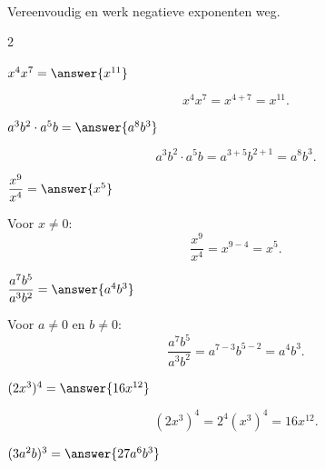 \documentclass{ximera}
\begin{document}
\begin{oefening}[Machten]{\oefB\ESS}
    \\
    
    Vereenvoudig en werk negatieve exponenten weg.
    
    \begin{multicols}{2}
    
    \begin{question}
    $x^4x^7=\answer{x^{11}}$
    
    \begin{oplossing}
    \[
    x^4x^7=x^{4+7}=x^{11}.
    \]
    \end{oplossing}
    \end{question}
    
    
    \begin{question}
    $a^3b^2\cdot a^5b=\answer{a^8b^3}$
    
    \begin{oplossing}
    \[
    a^3b^2\cdot a^5b
    =a^{3+5}b^{2+1}
    =a^8b^3.
    \]
    \end{oplossing}
    \end{question}
    
    
    \begin{question}
    $\dfrac{x^9}{x^4}=\answer{x^5}$
    
    \begin{oplossing}
    Voor $x\neq0$:
    \[
    \dfrac{x^9}{x^4}
    =x^{9-4}
    =x^5.
    \]
    \end{oplossing}
    \end{question}
    
    
    \begin{question}
    $\dfrac{a^7b^5}{a^3b^2}
    =\answer{a^4b^3}$
    
    \begin{oplossing}
    Voor $a\neq0$ en $b\neq0$:
    \[
    \dfrac{a^7b^5}{a^3b^2}
    =a^{7-3}b^{5-2}
    =a^4b^3.
    \]
    \end{oplossing}
    \end{question}
    
    
    \begin{question}
    $(2x^3)^4=\answer{16x^{12}}$
    
    \begin{oplossing}
    \[
    (2x^3)^4
    =2^4(x^3)^4
    =16x^{12}.
    \]
    \end{oplossing}
    \end{question}
    
    
    \begin{question}
    $(3a^2b)^3=\answer{27a^6b^3}$
    

\end{question}
\end{multicols}
\end{oefening}
\end{document}
